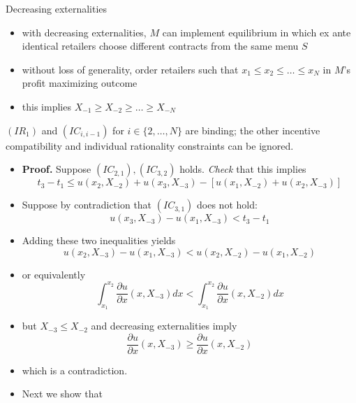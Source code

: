 \documentclass[11pt,english]{beamer}
\newcommand{\dif}{\partial}
\begin{document}
\begin{frame}[allowframebreaks]{Decreasing externalities}
  \begin{itemize}
  \item with decreasing externalities, $M$ can implement equilibrium
    in which ex ante identical retailers choose different contracts
    from the same menu $S$
  \item without loss of generality, order retailers such that $x_1
    \leq x_2 \leq \ldots \leq x_N$ in $M$'s profit maximizing outcome
  \item this implies $X_{-1} \geq X_{-2} \geq \ldots \geq X_{-N}$
  \end{itemize}
  \begin{lemma}
    $(IR_1)$ and $(IC_{i,i-1})$ for $i \in \{2,\ldots,N\}$ are
    binding; the other incentive compatibility and individual
    rationality constraints can be ignored.
  \end{lemma}
  \begin{itemize}
  \item \textbf{Proof.} Suppose $(IC_{2,1}),(IC_{3,2})$ holds. \emph{Check}
    that this implies
    \begin{equation*}
      t_3 -t_1 \leq u(x_2,X_{-2})+u(x_3,X_{-3})-[u(x_1,X_{-2})+u(x_2,X_{-3})]
    \end{equation*}
  \item Suppose by contradiction that $(IC_{3,1})$ does not hold:
    \begin{equation*}
      u(x_3,X_{-3})-u(x_1,X_{-3}) < t_3 -t_1
    \end{equation*}
  \item Adding these two inequalities yields
    \begin{equation*}
      u(x_2,X_{-3})-u(x_1,X_{-3}) < u(x_2,X_{-2})-u(x_1,X_{-2})
    \end{equation*}
  \item or equivalently
    \begin{equation*}
      \int_{x_1}^{x_2} \frac{\dif u}{\dif x} (x,X_{-3}) dx < \int_{x_1}^{x_2} \frac{\dif u}{\dif x} (x,X_{-2}) dx
    \end{equation*}
  \item but $X_{-3} \leq X_{-2}$ and decreasing externalities imply
    \begin{equation*}
    \frac{\dif u}{\dif x} (x,X_{-3}) \geq \frac{\dif u}{\dif x} (x,X_{-2})
  \end{equation*}
  \item which is a contradiction.
  \item Next we show that

\end{itemize}
\end{frame}
\end{document}
